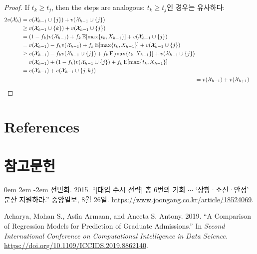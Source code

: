 \documentclass[11pt]{article} %
\theoremstyle{definition}
\theoremstyle{definition}
\begin{document}
\begin{proof}
\ifen If $t_k \geq t_j$, then the steps are analogous:
\else  $t_k \geq t_j$인 경우는 유사하다:\fi
\begin{align}
\begin{split}
2 v(\mathcal{X}_h) &= v(\mathcal{X}_{h-1} \cup\{j\}) + v(\mathcal{X}_{h-1} \cup\{j\}) \\
&\geq v(\mathcal{X}_{h-1} \cup\{k\}) + v(\mathcal{X}_{h-1} \cup\{j\}) \\
&= (1 - f_k) v(\mathcal{X}_{h-1}) + f_k \operatorname{E}[\max\{t_k, X_{h-1}\}] +  v(\mathcal{X}_{h-1} \cup\{j\})  \\
&= v(\mathcal{X}_{h-1}) - f_k  v(\mathcal{X}_{h-1}) + f_k \operatorname{E}[\max\{t_k, X_{h-1}\}] +  v(\mathcal{X}_{h-1} \cup\{j\})  \\
&\geq v(\mathcal{X}_{h-1}) - f_k  v(\mathcal{X}_{h-1}\cup\{j\}) + f_k \operatorname{E}[\max\{t_k, X_{h-1}\}] +  v(\mathcal{X}_{h-1} \cup\{j\})  \\
&= v(\mathcal{X}_{h-1}) + (1 - f_k) v(\mathcal{X}_{h-1}\cup\{j\}) + f_k \operatorname{E}[\max\{t_k, X_{h-1}\}]  \\
&= v(\mathcal{X}_{h-1}) + v(\mathcal{X}_{h-1} \cup\{j, k\})
\end{split}\\
&= v(\mathcal{X}_{h-1})  + v(\mathcal{X}_{h+1}) \qedhere
\end{align}
\end{proof}




\pagebreak
\ifen
\section*{References}
\else
\section*{참고문헌}
\fi
\noindent

\parskip 0em
\leftskip 2em
\parindent -2em
\ifen \else
전민희. 2015. ``{[대입 수시 전략]} 총 6번의 기회 $\cdots$ `상향·소신·안정' 분산 지원하라.'' 중앙일보, 8월 26일. \url{https://www.joongang.co.kr/article/18524069}.\fi

Acharya, Mohan S., Asfia Armaan, and Aneeta S. Antony. 2019. ``A Comparison of Regression Models for Prediction of Graduate Admissions.'' In \emph{Second International Conference on Computational Intelligence in Data Science.} \url{https://doi.org/10.1109/ICCIDS.2019.8862140}.
\end{document}
